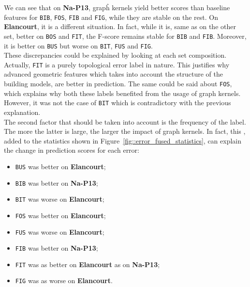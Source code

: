         We can see that on \textbf{Na-P13}, grapĥ kernels yield better scores than baseline features for \texttt{BIB}, \texttt{FOS}, \texttt{FIB} and \texttt{FIG}, while they are stable on the rest.
        On \textbf{Elancourt}, it is a different situation.
        In fact, while it is, same as on the other set, better on \texttt{BOS} and \texttt{FIT}, the F-score remains stable for \texttt{BIB} and \texttt{FIB}.
        Moreover, it is better on \texttt{BUS} but worse on \texttt{BIT}, \texttt{FUS} and \texttt{FIG}.\\

        These discrepancies could be explained by looking at each set composition.
        Actually, \texttt{FIT} is a purely topological error label in nature.
        This justifies why advanced geometric features which takes into account the structure of the building models, are better in prediction.
        The same could be said about \texttt{FOS}, which explains why both these labels benefited from the usage of graph kernels.
        However, it was not the case of \texttt{BIT} which is contradictory with the previous explanation.\\

        The second factor that should be taken into account is the frequency of the label.
        The more the latter is large, the larger the impact of graph kernels.
        In fact, this , added to the statistics shown in Figure~\ref{fig::error_fused_statistics}, can explain the change in prediction scores for each error:
        \begin{itemize}[label=\(\blacktriangleright\)]
            \item \texttt{BUS} was better on \textbf{Elancourt};
            \item \texttt{BIB} was better on \textbf{Na-P13};
            \item \texttt{BIT} was worse on \textbf{Elancourt};
            \item \texttt{FOS} was better on \textbf{Elancourt};
            \item \texttt{FUS} was worse on \textbf{Elancourt};
            \item \texttt{FIB} was better on \textbf{Na-P13};
            \item \texttt{FIT} was as better on \textbf{Elancourt} as on \textbf{Na-P13};
            \item \texttt{FIG} was as worse on \textbf{Elancourt}.
        \end{itemize}
        ~\\

